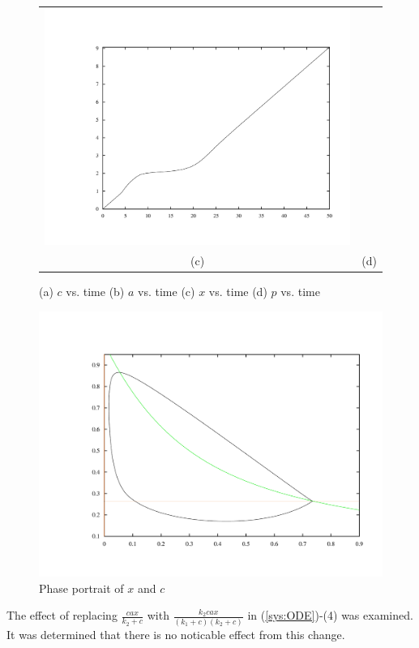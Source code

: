 \documentclass{article}
\begin{document}
\begin{center}
\begin{figure}
\begin{tabular}{cc}
      \includegraphics[scale = 0.3, angle = 0]{biprodTime.pdf}\\
      (c) & (d)
    \end{tabular}
    \caption{(a) $c$ vs. time (b) $a$ vs. time (c) $x$ vs. time (d) $p$ vs. time}
    \label{eqsVsTime}
  \end{figure}
\end{center}

\begin{center}
\begin{figure}
\includegraphics[scale = 0.5]{carbonBact.pdf}
\caption{Phase portrait of $x$ and $c$}
\label{phase:xc}
\end{figure}
\end{center}

The effect of replacing $\frac{cax}{k_2 +c}$ with $\frac{k_2 cax}{(k_1+c)(k_2+c)}$ in (\ref{sys:ODE})-(4) was examined. It was determined that there is no noticable effect from this change.
\end{document}
